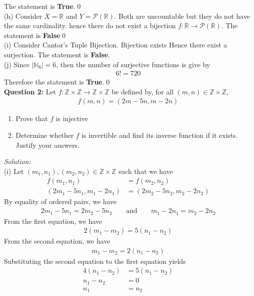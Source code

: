 \documentclass[12pt]{article}
\newcommand{\R}{\mathbb{R}}
\newcommand{\Z}{\mathbb{Z}}
\newcommand{\N}{\mathbb{N}}
\newcommand{\X}{\times}
\begin{document}
    The statement is \textbf{True}.\qed\\[2em]
    (h) Consider $X=\R$ and $Y=\mathcal{P}(\R)$. Both are uncountable but they do not have the same cardinality. hence there do not exist a bijection $f:\R\to\mathcal{P}(\R)$. The statement is \textbf{False}\qed\\[2em]
    (i) Consider Cantor's Tuple Bijection. Bijection exists Hence there exist a surjection. The statement is \textbf{False}. \\[2em]
    (j) Since $|\N_6|=6$, then the number of surjective functions is give by
    \begin{align*}
        6!=720
    \end{align*}
    Therefore the statement is \textbf{True}.\qed\\[2em]
    \noindent\textbf{Question 2:} Let $f:\Z\X\Z\to\Z\X\Z$ be defined by, for all $(m,n)\in\Z\X\Z$,
\begin{align*}
    f(m,n)=(2m-5n,m-2n)
\end{align*}
\begin{enumerate}[label=\roman*)]
    \item Prove that $f$ is injective
    \item Determine whether $f$ is invertible and find its inverse function if it exists. Justify your answers.
\end{enumerate}
\emph{Solution:}\\
(i) Let $(m_1,n_1),(m_2,n_2)\in\Z\X\Z$ such that we have
\begin{align*}
    f(m_1,n_1)&=f(m_2,n_2)\\
    (2m_1-5n_1,m_1-2n_1)&=(2m_2-5n_2,m_2-2n_2)
\end{align*}
By equality of ordered pairs, we have
\begin{align*}
    2m_1-5n_1=2m_2-5n_2\qquad\text{and}\qquad m_1-2n_1=m_2-2n_2
\end{align*}
From the first equation, we have
\begin{align*}
    2(m_1-m_2)=5(n_1-n_2)
\end{align*}
From the second equation, we have
\begin{align*}
    m_1-m_2=2(n_1-n_2)
\end{align*}
Substituting the second equation to the first equation yields
\begin{align*}
    4(n_1-n_2)&=5(n_1-n_2)\\
    n_1-n_2&=0\\
    n_1&=n_2
\end{align*}
\end{document}
